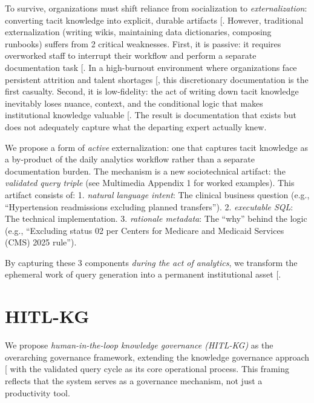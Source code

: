 \documentclass[
  american,
  11pt,
  letterpaper,
  oneside  ,captions=tableheading
]{scrartcl}
\begin{document}
To survive, organizations must shift reliance from socialization to
\emph{externalization}: converting tacit knowledge into explicit,
durable artifacts {[}\citeproc{ref-zhang2025}{25}{]}. However,
traditional externalization (writing wikis, maintaining data
dictionaries, composing runbooks) suffers from 2 critical weaknesses.
First, it is passive: it requires overworked staff to interrupt their
workflow and perform a separate documentation task
{[}\citeproc{ref-goffin2011}{26}{]}. In a high-burnout environment where
organizations face persistent attrition and talent shortages
{[}\citeproc{ref-himssworkforce2024}{27}{]}, this discretionary
documentation is the first casualty. Second, it is low-fidelity: the act
of writing down tacit knowledge inevitably loses nuance, context, and
the conditional logic that makes institutional knowledge valuable
{[}\citeproc{ref-foos2006}{22}{]}. The result is documentation that
exists but does not adequately capture what the departing expert
actually knew.

We propose a form of \emph{active} externalization: one that captures
tacit knowledge as a by-product of the daily analytics workflow rather
than a separate documentation burden. The mechanism is a new
sociotechnical artifact: the \emph{validated query triple} (see
Multimedia Appendix 1 for worked examples). This artifact consists of:
1. \emph{natural language intent}: The clinical business question (e.g.,
``Hypertension readmissions excluding planned transfers''). 2.
\emph{executable SQL}: The technical implementation. 3. \emph{rationale
metadata}: The ``why'' behind the logic (e.g., ``Excluding status 02 per
Centers for Medicare and Medicaid Services (CMS) 2025 rule'').

By capturing these 3 components \emph{during the act of analytics}, we
transform the ephemeral work of query generation into a permanent
institutional asset {[}\citeproc{ref-moore2018}{28}{]}.

\section{HITL-KG}\label{hitl-kg}

We propose \emph{human-in-the-loop knowledge governance (HITL-KG)} as
the overarching governance framework, extending the knowledge governance
approach {[}\citeproc{ref-foss2007}{29}{]} with the validated query
cycle as its core operational process. This framing reflects that the
system serves as a governance mechanism, not just a productivity tool.
\end{document}
